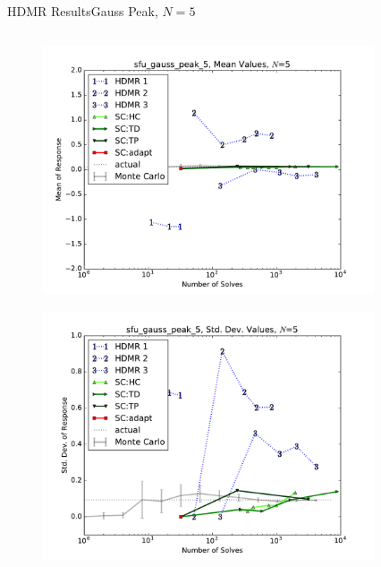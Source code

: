 \documentclass{beamer}
\begin{document}
\begin{frame}{HDMR Results}{Gauss Peak, $N=5$}\vspace{-20pt}
 \begin{columns}
   \begin{column}{0.5\textwidth}
        \begin{figure}[h!]
          \centering
          \includegraphics[width=0.8\linewidth]{anlmodels/sfu_gauss_peak_5_mean_vals}
        \end{figure}
        \vspace{-20pt}
        \begin{figure}[h!]
          \centering
          \includegraphics[width=0.8\linewidth]{anlmodels/sfu_gauss_peak_5_var_vals}
        \end{figure}
   \end{column}
   \begin{column}{0.5\textwidth}
        \begin{figure}[h!]
          \centering

\end{figure}
\end{column}
\end{columns}
\end{frame}
\end{document}
